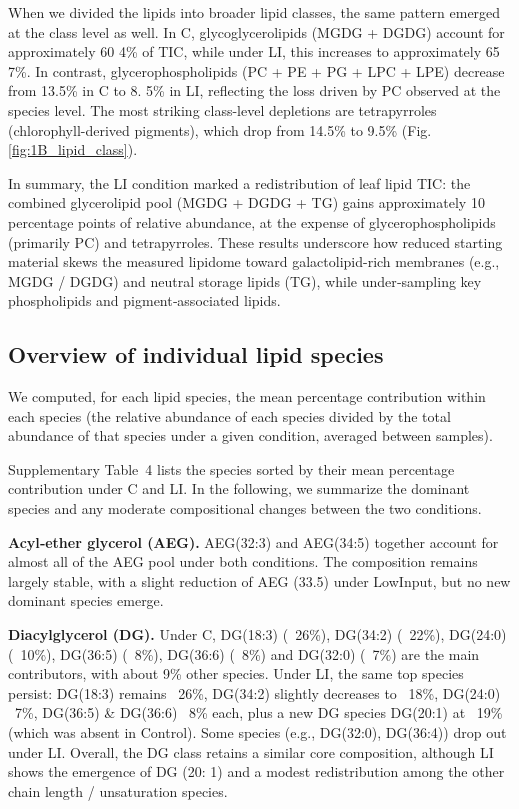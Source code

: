 \documentclass[10pt,letterpaper]{article}
\begin{document}
When we divided the lipids into broader lipid classes, the same pattern emerged at the class level as well. In C, glycoglycerolipids (MGDG + DGDG) account for approximately 60 4\% of TIC, while under LI, this increases to approximately 65 7\%. In contrast, glycerophospholipids (PC + PE + PG + LPC + LPE) decrease from 13.5\% in C to 8. 5\% in LI, reflecting the loss driven by PC observed at the species level. The most striking class-level depletions are tetrapyrroles (chlorophyll-derived pigments), which drop from 14.5\% to 9.5\% (Fig. \ref{fig:1B_lipid_class}).

In summary, the LI condition marked a redistribution of leaf lipid TIC: the combined glycerolipid pool (MGDG + DGDG + TG) gains approximately 10 percentage points of relative abundance, at the expense of glycerophospholipids (primarily PC) and tetrapyrroles. These results underscore how reduced starting material skews the measured lipidome toward galactolipid-rich membranes (e.g., MGDG / DGDG) and neutral storage lipids (TG), while under‐sampling key phospholipids and pigment‐associated lipids.

\subsection*{Overview of individual lipid species}
We computed, for each lipid species, the mean percentage contribution within each species (the relative abundance of each species divided by the total abundance of that species under a given condition, averaged between samples). 

Supplementary Table~4 lists the species sorted by their mean percentage contribution under C and LI. In the following, we summarize the dominant species and any moderate compositional changes between the two conditions.

\bigskip

\textbf{Acyl‐ether glycerol (AEG).}  
AEG(32:3) and AEG(34:5) together account for almost all of the AEG pool under both conditions. The composition remains largely stable, with a slight reduction of AEG (33.5) under LowInput, but no new dominant species emerge.

\textbf{Diacylglycerol (DG).}  
Under C, DG(18:3) (~26\%), DG(34:2) (~22\%), DG(24:0) (~10\%), DG(36:5) (~8\%), DG(36:6) (~8\%) and DG(32:0) (~7\%) are the main contributors, with about 9\% other species. Under LI, the same top species persist: DG(18:3) remains ~26\%, DG(34:2) slightly decreases to ~18\%, DG(24:0) ~7\%, DG(36:5) & DG(36:6) ~8\% each, plus a new DG species DG(20:1) at ~19\% (which was absent in Control). Some species (e.g., DG(32:0), DG(36:4)) drop out under LI. Overall, the DG class retains a similar core composition, although LI shows the emergence of DG (20: 1) and a modest redistribution among the other chain length / unsaturation species.
\end{document}
